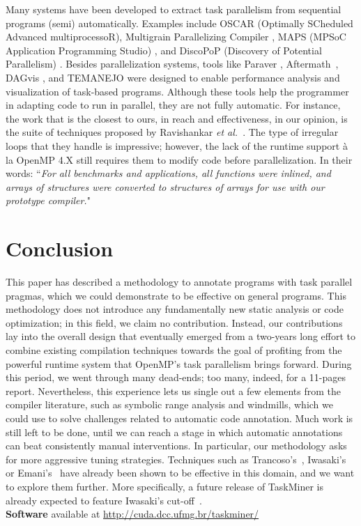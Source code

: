 \documentclass[sigplan,10pt,screen]{acmart}
\newcommand\Taskminer{\mbox{\textsf{TaskMiner}}}
\begin{document}
Many systems have been developed to extract task parallelism from sequential
programs (semi) automatically.
Examples include OSCAR
(Optimally SCheduled Advanced multiprocessoR), Multigrain Parallelizing
Compiler \cite{ishizaka:journal:2000, kasahara:iwlcpc:2000},  MAPS (MPSoC
Application Programming  Studio) \cite{castrillon:tii:2013, ceng:dac:2008}, and
DiscoPoP (Discovery of Potential Parallelism) \cite{discopop, li:jss:2016}.
Besides parallelization systems, tools like Paraver \cite{extrae, paraver},
Aftermath~\cite{drebes:hipeac:2014}, DAGvis \cite{huynh:wvpa:2015}, and TEMANEJO
\cite{Brinkmann13} were  designed to
enable performance analysis and visualization of task-based programs.
Although these tools help the programmer in adapting code
to run in parallel, they are not fully automatic.
For instance, the work that is the closest to ours, in reach and effectiveness,
in our opinion, is the suite of techniques proposed by Ravishankar {\em et
al.}~\cite{Ravishankar14}.
The type of irregular loops that they handle is impressive; however,
the lack of the runtime support \`{a} la OpenMP 4.X still requires them to
modify code before parallelization.
In their words: ``{\em For all benchmarks and applications, all functions were 
inlined, and arrays of structures were converted to structures of arrays for use
with our prototype compiler.}"


\section{Conclusion}
\label{sec:conc}

This paper has described a methodology to annotate programs with task
parallel pragmas, which we could demonstrate to be effective
on general programs.
This methodology does not introduce any fundamentally new static analysis or code 
optimization; in this field, we claim no contribution.
Instead, our contributions lay into the overall design that eventually
emerged from a two-years long effort to combine existing compilation techniques
towards the goal of profiting from the powerful runtime system that OpenMP's
task parallelism brings forward.
During this period, we went through many dead-ends; too many, indeed, for a
11-pages report.
Nevertheless, this experience lets us single out a few elements from the
compiler literature, such as symbolic range analysis and windmills, which we
could use to solve challenges related to automatic code annotation.
Much work is still left to be done, until we can reach a stage in which
automatic annotations can beat consistently manual interventions.
In particular, our methodology asks for more aggressive tuning strategies.
Techniques such as Trancoso's~\cite{Trancoso17}, Iwasaki's~\cite{Iwasaki16B}
or Emani's~\cite{Emani15} have already been shown to be effective in this
domain, and we want to explore them further.
More specifically, a future release of \Taskminer{} is already expected to
feature Iwasaki's cut-off~\cite{Iwasaki16B}. \\
\textbf{Software} available at \url{http://cuda.dcc.ufmg.br/taskminer/}


\end{document}
